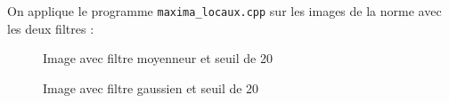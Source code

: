 \documentclass[french,a4paper,10pt]{article}
\begin{document}
    On applique le programme \texttt{maxima\_locaux.cpp} sur les images de la norme avec les deux filtres : %

    \begin{figure}[!htb]
        \begin{minipage}{0.48\textwidth}
            \centering
            \caption{Image avec filtre moyenneur et seuil de 20}\label{Fig:maxima-20-gradient-filtre-moyenneur-peppers-grey}
        \end{minipage}\hfill
        \begin{minipage}{0.48\textwidth}
            \centering
            \caption{Image avec filtre gaussien et seuil de 20}\label{Fig:maxima-20-gradient-filtre-gaussien-peppers-grey}
        \end{minipage}
    \end{figure}
\end{document}
